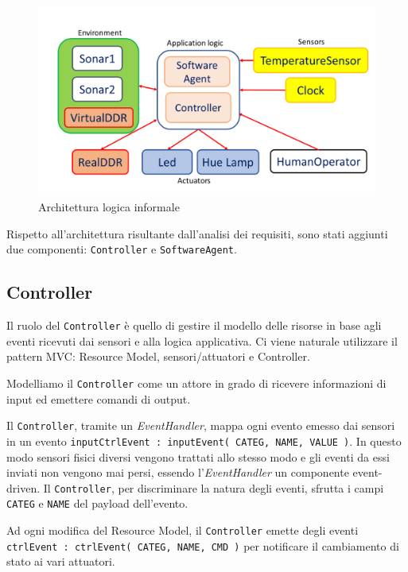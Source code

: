 \documentclass{../llncs}
\newcommand{\codescript}[1]{{\mbox{\small{\texttt{#1}}}}\xspace}
\newcommand{\labelfig}[1]{\label{fig:#1}}
\begin{document}
\begin{figure}[!htb]
\centering
\includegraphics[scale=0.4]{img/informalLogicalArchitecture.png}
\caption{Architettura logica informale}\labelfig{informalLA}
\end{figure}

Rispetto all'architettura risultante dall'analisi dei requisiti, sono stati aggiunti due componenti: \texttt{Controller} e \texttt{SoftwareAgent}. 

\subsection{Controller}
Il ruolo del \texttt{Controller} è quello di gestire il modello delle risorse in base agli eventi ricevuti dai sensori e alla logica applicativa. Ci viene naturale utilizzare il pattern MVC: Resource Model, sensori/attuatori e Controller.

Modelliamo il \texttt{Controller} come un attore in grado di ricevere informazioni di input ed emettere comandi di output.



Il \texttt{Controller}, tramite un \emph{EventHandler}, mappa ogni evento emesso dai sensori in un evento \codescript{inputCtrlEvent  : inputEvent( CATEG, NAME, VALUE )}. In questo modo sensori fisici diversi vengono trattati allo stesso modo e gli eventi da essi inviati non vengono mai persi, essendo l'\emph{EventHandler} un componente event-driven. Il \texttt{Controller}, per discriminare la natura degli eventi, sfrutta i campi \codescript{CATEG} e \codescript{NAME} del payload dell'evento.

Ad ogni modifica del Resource Model, il \texttt{Controller} emette degli eventi \codescript{ctrlEvent : ctrlEvent( CATEG, NAME, CMD )} per notificare il cambiamento di stato ai vari attuatori.
\end{document}
